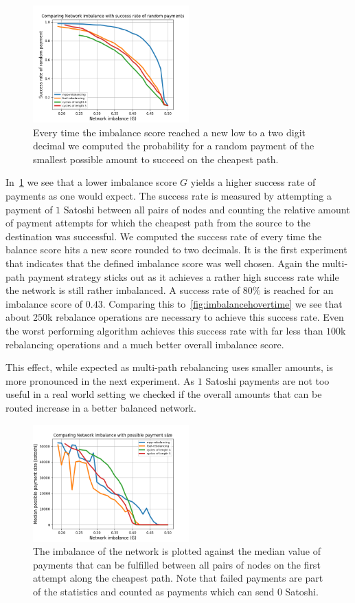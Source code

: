 \documentclass[conference]{IEEEtran}
\begin{document}
\begin{figure}
 \centering
 \includegraphics[width=6cm]{code/vs/fig/imba_vs_success_rates.png}
 \caption{Every time the imbalance score reached a new low to a two digit decimal we computed the probability for a random payment of the smallest possible amount to succeed on the cheapest path.}
 \label{fig:imba_vs_success}
\end{figure}

In~\cref{fig:imba_vs_success} we see that a lower imbalance score $G$ yields a higher success rate of payments as one would expect.
The success rate is measured by attempting a payment of $1$ Satoshi between all pairs of nodes and counting the relative amount of payment attempts for which the cheapest path from the source to the destination was successful.
We computed the success rate of every time the balance score hits a new score rounded to two decimals.
It is the first experiment that indicates that the defined imbalance score was well chosen. 
Again the multi-path payment strategy sticks out as it achieves a rather high success rate while the network is still rather imbalanced.
A success rate of $80\%$ is reached for an imbalance score of $0.43$.
Comparing this to~\cref{fig:imbalancehovertime} we see that about $250$k rebalance operations are necessary to achieve this success rate.
Even the worst performing algorithm achieves this success rate with far less than $100$k rebalancing operations and a much better overall imbalance score. 

This effect, while expected as multi-path rebalancing uses smaller amounts, is more pronounced in the next experiment.
As $1$ Satoshi payments are not too useful in a real world setting we checked if the overall amounts that can be routed increase in a better balanced network.

\begin{figure}
 \centering
 \includegraphics[width=6cm]{code/vs/fig/imba_vs_median_payment_size.png}
 \caption{The imbalance of the network is plotted against the median value of payments that can be fulfilled between all pairs of nodes on the first attempt along the cheapest path. Note that failed payments are part of the statistics and counted as payments which can send $0$ Satoshi.}
 \label{fig:imba_vs_payment_size}
\end{figure}
\end{document}
